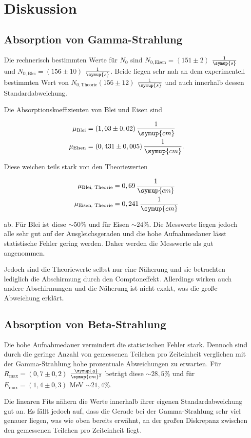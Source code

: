 \section{Diskussion}
\label{sec:Diskussion}

\subsection{Absorption von Gamma-Strahlung}

Die rechnerisch bestimmten Werte für $N_0$ sind $N_{0,\text{Eisen}} = (151 \pm 2)$ $\frac{1}{\symup{s}}$ und $N_{0,\text{Blei}} = (156 \pm 10)$ $\frac{1}{\symup{s}}$. 
Beide liegen sehr nah an dem experimentell bestimmten Wert von $N_{0,\text{Theorie}} (156 \pm 12)$ $\frac{1}{\symup{s}}$ und auch innerhalb dessen Standardabweichung.

Die Absorptionskoeffizienten von Blei und Eisen sind

\begin{align*}
    \mu_\text{Blei} &= (1,03 \pm 0,02) \, \frac{1}{\symup{cm}}\\
    \mu_\text{Eisen} &= (0,431 \pm 0,005) \, \frac{1}{\symup{cm}}.
\end{align*}

Diese weichen teils stark von den Theoriewerten

\begin{align*}
    \mu_\text{Blei, Theorie} &= 0,69 \, \frac{1}{\symup{cm}}\\
    \mu_\text{Eisen, Theorie} &= 0,241 \, \frac{1}{\symup{cm}}
\end{align*}

ab. Für Blei ist diese $\sim \! 50\%$ und für Eisen $\sim \! 24\%$.
Die Messwerte liegen jedoch alle sehr gut auf der Ausgleichsgeraden und die hohe Aufnahmedauer lässt statistische Fehler gering werden.
Daher werden die Messwerte als gut angenommen.

Jedoch sind die Theoriewerte selbst nur eine Näherung und sie betrachten lediglich die Abschirmung durch den Comptoneffekt.
Allerdings wirken auch andere Abschirmungen und die Näherung ist nicht exakt, was die große Abweichung erklärt.



\subsection{Absorption von Beta-Strahlung}

Die hohe Aufnahmedauer vermindert die statistischen Fehler stark. Dennoch sind durch die geringe Anzahl von gemessenen Teilchen pro Zeiteinheit
verglichen mit der Gamma-Strahlung hohe prozentuale Abweichungen zu erwarten.
Für $R_\text{max} = (0,7 \pm 0,2)$ $\frac{\symup{g}}{\symup{cm}^2}$ beträgt diese $\sim \! 28,5 \%$ und für $E_\text{max} = (1,4 \pm 0,3)$ MeV $\sim \! 21,4 \%$.

Die linearen Fits nähern die Werte innerhalb ihrer eigenen Standardabweichung gut an. Es fällt jedoch auf, dass die Gerade bei der Gamma-Strahlung sehr viel genauer liegen,
was wie oben bereits erwähnt, an der großen Diskrepanz zwischen den gemessenen Teilchen pro Zeiteinheit liegt.